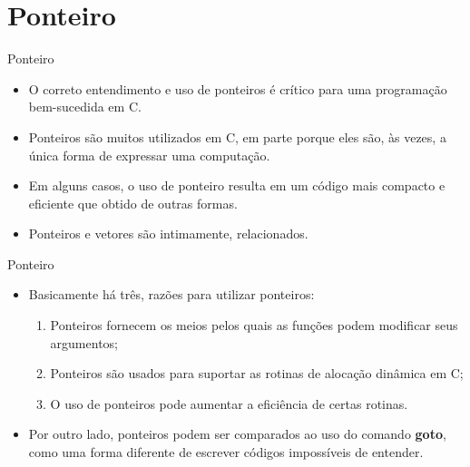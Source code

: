 \section{Ponteiro}

\begin{frame}[c]{Ponteiro}
  \begin{itemize}[<+->]
    \item O correto entendimento e uso de ponteiros é crítico para uma programação bem-sucedida em C.
  \item Ponteiros são muitos utilizados em C, em parte porque eles são, às vezes, a única forma de expressar uma computação.
  \item Em alguns casos, o uso de ponteiro resulta em um código mais compacto e eficiente que obtido de outras formas.
  \item Ponteiros e vetores são intimamente, relacionados.  
  \end{itemize}
\end{frame}

\begin{frame}[c]{Ponteiro}
 \begin{itemize}[<+->]
   \item Basicamente há três, razões para utilizar ponteiros:
      \begin{enumerate}[<+->]
        \item Ponteiros fornecem os meios pelos quais as funções podem modificar seus argumentos;
        \item Ponteiros são usados para suportar as rotinas de alocação dinâmica em C;
        \item O uso de ponteiros pode aumentar a eficiência de certas rotinas.
    \end{enumerate}
  \item Por outro lado, ponteiros podem ser comparados ao uso do comando \textbf{goto}, como uma forma diferente de escrever códigos impossíveis de entender. 
 \end{itemize}
\end{frame}

